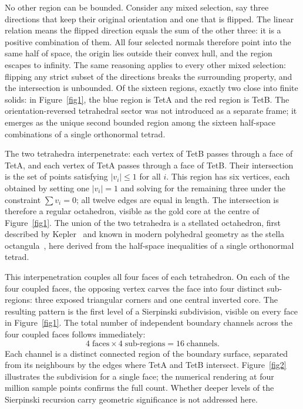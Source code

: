\documentclass[twocolumn]{iopjournal}
\begin{document}
No other region can be bounded. Consider any mixed selection, say three
directions that keep their original orientation and one that is flipped. The
linear relation means the flipped direction equals the sum of the other three:
it is a positive combination of them. All four selected normals therefore
point into the same half of space, the origin lies outside their convex
hull, and the region escapes to infinity. The same reasoning applies to
every other mixed selection: flipping any strict subset of the directions breaks
the surrounding property, and the intersection is unbounded. Of the
sixteen regions, exactly two close into finite solids: in
Figure~\ref{fig1}, the blue region is TetA and the red region is TetB.
The orientation-reversed tetrahedral sector was not introduced as a
separate frame; it emerges as the unique second bounded region among the
sixteen half-space combinations of a single orthonormal tetrad.

The two tetrahedra interpenetrate: each vertex of TetB passes through a
face of TetA, and each vertex of TetA passes through a face of TetB.
Their intersection is the set of points satisfying $|v_i| \leq 1$ for all
$i$. This region has six vertices, each obtained by setting one
$|v_i| = 1$ and solving for the remaining three under the constraint
$\sum v_i = 0$; all twelve edges are equal in length. The intersection is
therefore a regular octahedron, visible as the gold core at the centre of
Figure~\ref{fig1}. The union of the two tetrahedra is a stellated
octahedron, first described by Kepler~\cite{Kepler1619} and known in
modern polyhedral geometry as the stella
octangula~\cite{Cromwell1997}, here derived from the half-space inequalities
of a single orthonormal tetrad.

This interpenetration couples all four faces of each tetrahedron. On each
of the four coupled faces, the opposing vertex carves the face into four
distinct sub-regions: three exposed triangular corners and one central
inverted core. The resulting pattern is the
first level of a Sierpinski subdivision, visible on every face in
Figure~\ref{fig1}. The total number of independent boundary channels
across the four coupled faces follows immediately:
\begin{equation}
4 \;\text{faces} \times 4 \;\text{sub-regions} = 16 \;\text{channels}.
\label{eq:channels}
\end{equation}
Each channel is a distinct connected region of the boundary surface,
separated from its neighbours by the edges where TetA and TetB intersect.
Figure~\ref{fig2} illustrates the subdivision for a single face; the
numerical rendering at four million sample points confirms the full count.
Whether deeper levels of the Sierpinski recursion carry geometric
significance is not addressed here.
\end{document}
